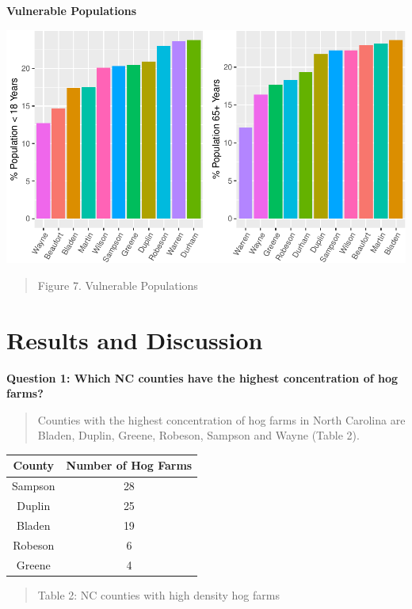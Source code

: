 \documentclass[
  12pt,
]{article}
\begin{document}
\newpage

\textbf{Vulnerable Populations}

\includegraphics{JacobChan_FinalProject_HogFarms_files/figure-latex/vulnerable final-1.pdf}

\begin{quote}
Figure 7. Vulnerable Populations
\end{quote}

\newpage

\hypertarget{results-and-discussion}{%
\section{Results and Discussion}\label{results-and-discussion}}

\textbf{Question 1: Which NC counties have the highest concentration of
hog farms?}

\begin{quote}
Counties with the highest concentration of hog farms in North Carolina
are Bladen, Duplin, Greene, Robeson, Sampson and Wayne (Table 2).
\end{quote}

\begin{longtable}[]{@{}cc@{}}
\toprule
County & Number of Hog Farms \\
\midrule
\endhead
Sampson & 28 \\
Duplin & 25 \\
Bladen & 19 \\
Robeson & 6 \\
Greene & 4 \\
\bottomrule
\end{longtable}

\begin{quote}
Table 2: NC counties with high density hog farms
\end{quote}
\end{document}
